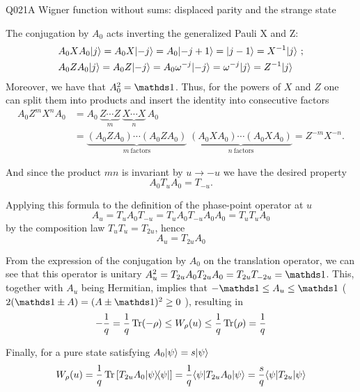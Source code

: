 \begin{entry}{Q021}{A Wigner function without sums: displaced parity and the strange state}
\begin{solution}[a]
The conjugation by $A_0$ acts inverting the generalized Pauli X and Z:
\begin{equation*}
\begin{split}
    &A_0 X A_0 \lvert j \rangle =   A_0 X \lvert -j \rangle= A_0 \lvert -j+1 \rangle = \lvert j-1 \rangle = X^{-1}\lvert j \rangle\ ;\\
    &A_0 Z A_0 \lvert j \rangle =   A_0 Z \lvert -j \rangle= A_0 \omega^{-j}\lvert -j \rangle =\omega^{-j}\lvert j \rangle = Z^{-1}\lvert j \rangle
\end{split}
\end{equation*}
Moreover, we have that $A_0^2=\id$. Thus, for the powers of $X$ and $Z$ one can split them into products and insert the identity into consecutive factors 
\begin{equation*}
\begin{split}
  A_0 Z^m X^n A_0
  &= A_0\,\underbrace{Z\cdots Z}_{m}\,\underbrace{X\cdots X}_{n}\,A_0 \\
  &= \underbrace{(A_0ZA_0)\cdots(A_0ZA_0)}_{m\ \text{factors}}\;
     \underbrace{(A_0XA_0)\cdots(A_0XA_0)}_{n\ \text{factors}}
   = Z^{-m}X^{-n}.
\end{split}
\end{equation*}

And since the product $mn$ is invariant by $u\rightarrow -u$ we have the desired property
\begin{equation}
    A_0 T_u A_0 = T_{-u}.
\end{equation}

Applying this formula to the definition of the phase-point operator at $u$
\begin{equation*}
    A_u = T_uA_0T_{-u} = T_uA_0T_{-u} A_0A_0 = T_uT_u A_0
\end{equation*}
by the composition law $T_uT_u=T_{2u}$, hence
\begin{equation}
     A_u = T_{2u}A_0
\end{equation}

From the expression of the conjugation by $A_0$ on the translation operator, we can see that this operator is unitary $A_{u}^2= T_{2u}A_0T_{2u}A_0=T_{2u}T_{-2u}=\id$. This, together with $A_u$ being Hermitian, implies that $-\id \leq A_u \leq \id $ ($2(\id \pm A) = (A \pm \id)^2\geq 0$ ), resulting in 
\begin{equation}
    -\frac1q =  \frac1q\operatorname{Tr}(-\rho) \le W_\rho(u)\le \frac1q\operatorname{Tr}(\rho)=\frac1q
\end{equation}

Finally, for a pure state satisfying $A_0\lvert \psi \rangle=s\lvert \psi \rangle$
\begin{equation}
    W_\rho(u)= \frac{1}{q} \operatorname{Tr}\left[ T_{2u}A_0 \lvert \psi \rangle\!\langle \psi \rvert \right] = \frac{1}{q}\langle \psi \vert T_{2u}A_0 \vert \psi \rangle =\frac{s}{q}\langle \psi \vert T_{2u} \vert \psi \rangle
\end{equation}



\end{solution}
\end{entry}
